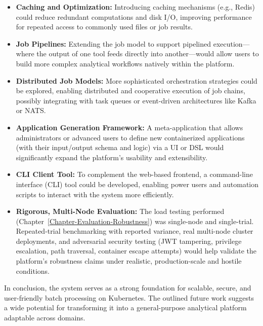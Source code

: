 \begin{itemize}
    \item \textbf{Caching and Optimization:} Introducing caching mechanisms (e.g., Redis) could reduce redundant computations and disk I/O, improving performance for repeated access to commonly used files or job results.
    
    \item \textbf{Job Pipelines:} Extending the job model to support pipelined execution—where the output of one tool feeds directly into another—would allow users to build more complex analytical workflows natively within the platform.
    
    \item \textbf{Distributed Job Models:} More sophisticated orchestration strategies could be explored, enabling distributed and cooperative execution of job chains, possibly integrating with task queues or event-driven architectures like Kafka or NATS.
    
    \item \textbf{Application Generation Framework:} A meta-application that allows administrators or advanced users to define new containerized applications (with their input/output schema and logic) via a UI or DSL would significantly expand the platform’s usability and extensibility.
    
    \item \textbf{CLI Client Tool:} To complement the web-based frontend, a command-line interface (CLI) tool could be developed, enabling power users and automation scripts to interact with the system more efficiently.
    
    \item \textbf{Rigorous, Multi-Node Evaluation:} The load testing performed (Chapter~\ref{Chapter-Evaluation-Robustness}) was single-node and single-trial. Repeated-trial benchmarking with reported variance, real multi-node cluster deployments, and adversarial security testing (JWT tampering, privilege escalation, path traversal, container escape attempts) would help validate the platform's robustness claims under realistic, production-scale and hostile conditions.
\end{itemize}

In conclusion, the system serves as a strong foundation for scalable, secure, and user-friendly batch processing on Kubernetes. The outlined future work suggests a wide potential for transforming it into a general-purpose analytical platform adaptable across domains.
